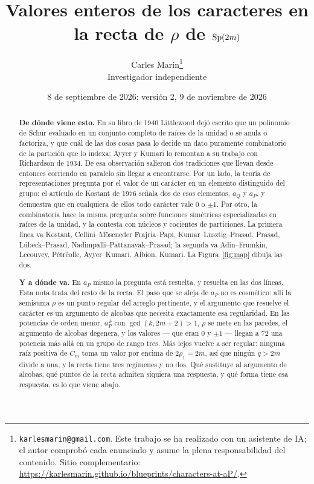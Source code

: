 \documentclass[11pt,a4paper]{article}
\title{\vspace{-1.4cm}\Large Valores enteros de los caracteres en la recta de $\rho$ de $\mathrm{Sp}(2m)$}
\author{\normalsize Carles Marín\thanks{\texttt{karlesmarin@gmail.com}.
Este trabajo se ha realizado con un asistente de IA; el autor comprobó cada enunciado y asume la plena responsabilidad del contenido. Sitio complementario: \url{https://karlesmarin.github.io/blueprints/characters-at-aP/}.}\\[2pt]\small Investigador independiente}
\date{\normalsize 8 de septiembre de 2026; versión 2, 9 de noviembre de 2026}
\begin{document}
\maketitle
\thispagestyle{empty}

\begin{abstract}
\noindent \textbf{De dónde viene esto.} En su libro de 1940 Littlewood dejó escrito que un polinomio de Schur
evaluado en un conjunto completo de raíces de la unidad o se anula o factoriza, y que cuál de las
dos cosas pasa lo decide un dato puramente combinatorio de la partición que lo indexa; Ayyer y
Kumari \cite[\S1]{AK25} lo remontan a su trabajo con Richardson de 1934. De esa
observación salieron dos tradiciones que llevan desde entonces corriendo en paralelo sin llegar a
encontrarse. Por un lado, la teoría de representaciones pregunta por el valor de un carácter en un
elemento distinguido del grupo: el artículo de Kostant de 1976 señala dos de esos elementos, $a_Q$ y
$a_P$, y demuestra que en cualquiera de ellos todo carácter vale $0$ o $\pm1$. Por otro, la
combinatoria hace la misma pregunta sobre funciones simétricas especializadas en raíces de la
unidad, y la contesta con núcleos y cocientes de particiones. La primera línea va Kostant,
Cellini--Möseneder Frajria--Papi, Kumar--Lusztig--Prasad, Prasad, Lübeck--Prasad,
Nadimpalli--Pattanayak--Prasad; la segunda va Adin--Frumkin, Lecouvey, Pétréolle, Ayyer--Kumari,
Albion, Kumari. La Figura~\ref{fig:map} dibuja las dos.

\smallskip
\noindent \textbf{Y a dónde va.} En $a_P$ mismo la pregunta está resuelta, y resuelta en las dos
líneas. Esta nota trata del resto de la recta. El paso que se aleja de $a_P$ no es cosmético: allí
la semisuma $\rho$ es un punto regular del arreglo pertinente, y el argumento que resuelve el
carácter es un argumento de alcobas que necesita exactamente esa regularidad. En las
potencias de orden menor, $a_P^{\,k}$ con $\gcd(k,2m+2)>1$, $\rho$ se mete en las paredes, el argumento de alcobas degenera, y los valores --- que
eran $0$ y $\pm1$ --- llegan a $72$ una potencia más allá en un grupo de rango tres. Más lejos
vuelve a ser regular: ninguna raíz positiva de $C_m$ toma un valor por encima de $2\rho_1=2m$,
así que ningún $q>2m$ divide a una, y la recta tiene tres regímenes y no dos. Qué sustituye
al argumento de alcobas, qué puntos de la recta admiten siquiera una respuesta, y qué forma tiene
esa respuesta, es lo que viene abajo.



\end{abstract}
\end{document}
